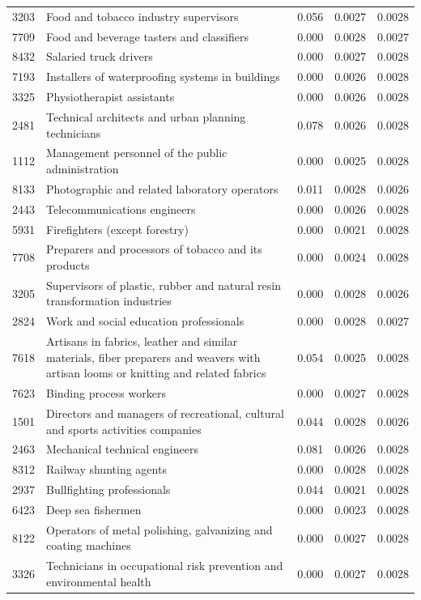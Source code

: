 \begin{longtable}{p{}>{\raggedright\arraybackslash}p{}rrr}
3203 & Food and tobacco industry supervisors & 0.056 & 0.0027 & 0.0028 \\
7709 & Food and beverage tasters and classifiers & 0.000 & 0.0028 & 0.0027 \\
8432 & Salaried truck drivers & 0.000 & 0.0027 & 0.0028 \\
7193 & Installers of waterproofing systems in buildings & 0.000 & 0.0026 & 0.0028 \\
3325 & Physiotherapist assistants & 0.000 & 0.0026 & 0.0028 \\
2481 & Technical architects and urban planning technicians & 0.078 & 0.0026 & 0.0028 \\
1112 & Management personnel of the public administration & 0.000 & 0.0025 & 0.0028 \\
8133 & Photographic and related laboratory operators & 0.011 & 0.0028 & 0.0026 \\
2443 & Telecommunications engineers & 0.000 & 0.0026 & 0.0028 \\
5931 & Firefighters (except forestry) & 0.000 & 0.0021 & 0.0028 \\
7708 & Preparers and processors of tobacco and its products & 0.000 & 0.0024 & 0.0028 \\
3205 & Supervisors of plastic, rubber and natural resin transformation industries & 0.000 & 0.0028 & 0.0026 \\
2824 & Work and social education professionals & 0.000 & 0.0028 & 0.0027 \\
7618 & Artisans in fabrics, leather and similar materials, fiber preparers and weavers with artisan looms or knitting and related fabrics & 0.054 & 0.0025 & 0.0028 \\
7623 & Binding process workers & 0.000 & 0.0027 & 0.0028 \\
1501 & Directors and managers of recreational, cultural and sports activities companies & 0.044 & 0.0028 & 0.0026 \\
2463 & Mechanical technical engineers & 0.081 & 0.0026 & 0.0028 \\
8312 & Railway shunting agents & 0.000 & 0.0028 & 0.0028 \\
2937 & Bullfighting professionals & 0.044 & 0.0021 & 0.0028 \\
6423 & Deep sea fishermen & 0.000 & 0.0023 & 0.0028 \\
8122 & Operators of metal polishing, galvanizing and coating machines & 0.000 & 0.0027 & 0.0028 \\
3326 & Technicians in occupational risk prevention and environmental health & 0.000 & 0.0027 & 0.0028 \\

\end{longtable}
